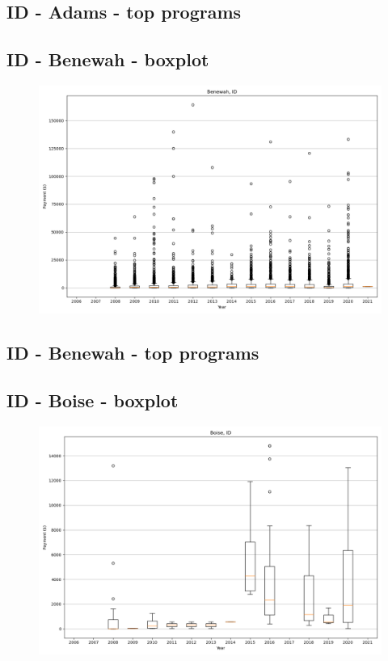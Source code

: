 \subsection*{ID - Adams - top programs}

\newpage
\subsection*{ID - Benewah - boxplot}
\begin{figure}[h]
\centering
\includegraphics[width=7in]{../output/boxplots/counties/Benewah-ID_boxplot.png}
\end{figure}


\subsection*{ID - Benewah - top programs}

\newpage
\subsection*{ID - Boise - boxplot}
\begin{figure}[h]
\centering
\includegraphics[width=7in]{../output/boxplots/counties/Boise-ID_boxplot.png}
\end{figure}


